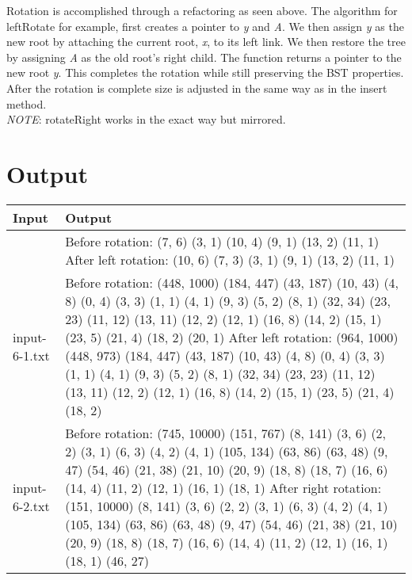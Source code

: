 \documentclass[11pt]{article}
\begin{document}
    Rotation is accomplished through a refactoring as seen above. The algorithm for leftRotate for example, first creates a pointer to \textit{y} and \textit{A}. We then assign \textit{y} as the new root by attaching the current root, \textit{x}, to its left link. We then restore the tree by assigning \textit{A} as the old root's right child. The function returns a pointer to the new root \textit{y}. This completes the rotation while still preserving the BST properties. After the rotation is complete size is adjusted in the same way as in the insert method. \\
    \textit{NOTE}: rotateRight works in the exact way but mirrored.

\pagebreak

\section*{Output}
\begin{center}
\begin{tabular}{|p{10em}|p{30em}|} 
\hline
\textbf{Input} & \textbf{Output} \\ 
\hline
[7, 10, 3, 9, 13, 11] & Before rotation: (7, 6) (3, 1) (10, 4) (9, 1) (13, 2) (11, 1) \newline After left rotation: (10, 6) (7, 3) (3, 1) (9, 1) (13, 2) (11, 1) \\ 
\hline 
input-6-1.txt & Before rotation: (448, 1000) (184, 447) (43, 187) (10, 43) (4, 8) (0, 4) (3, 3) (1, 1) (4, 1) (9, 3) (5, 2) (8, 1) (32, 34) (23, 23) (11, 12) (13, 11) (12, 2) (12, 1) (16, 8) (14, 2) (15, 1) (23, 5) (21, 4) (18, 2) (20, 1) \newline After left rotation: (964, 1000) (448, 973) (184, 447) (43, 187) (10, 43) (4, 8) (0, 4) (3, 3) (1, 1) (4, 1) (9, 3) (5, 2) (8, 1) (32, 34) (23, 23) (11, 12) (13, 11) (12, 2) (12, 1) (16, 8) (14, 2) (15, 1) (23, 5) (21, 4) (18, 2) \\ 
\hline 
input-6-2.txt & Before rotation: (745, 10000) (151, 767) (8, 141) (3, 6) (2, 2) (3, 1) (6, 3) (4, 2) (4, 1) (105, 134) (63, 86) (63, 48) (9, 47) (54, 46) (21, 38) (21, 10) (20, 9) (18, 8) (18, 7) (16, 6) (14, 4) (11, 2) (12, 1) (16, 1) (18, 1) \newline After right rotation: (151, 10000) (8, 141) (3, 6) (2, 2) (3, 1) (6, 3) (4, 2) (4, 1) (105, 134) (63, 86) (63, 48) (9, 47) (54, 46) (21, 38) (21, 10) (20, 9) (18, 8) (18, 7) (16, 6) (14, 4) (11, 2) (12, 1) (16, 1) (18, 1) (46, 27) \\ 
\hline
\end{tabular}
\end{center}
\end{document}
